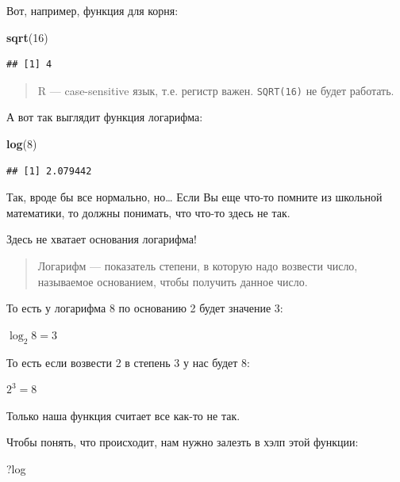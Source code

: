 \documentclass[]{book}
\newenvironment{Shaded}{\begin{snugshade}}{\end{snugshade}}
\newcommand{\DecValTok}[1]{\textcolor[rgb]{0.00,0.00,0.81}{#1}}
\newcommand{\KeywordTok}[1]{\textcolor[rgb]{0.13,0.29,0.53}{\textbf{#1}}}
\newcommand{\NormalTok}[1]{#1}
\begin{document}
Вот, например, функция для корня:

\begin{Shaded}
\begin{Highlighting}[]
\KeywordTok{sqrt}\NormalTok{(}\DecValTok{16}\NormalTok{)}
\end{Highlighting}
\end{Shaded}

\begin{verbatim}
## [1] 4
\end{verbatim}

\begin{quote}
R --- case-sensitive язык, т.е. регистр важен. \texttt{SQRT(16)} не будет работать.
\end{quote}

А вот так выглядит функция логарифма:

\begin{Shaded}
\begin{Highlighting}[]
\KeywordTok{log}\NormalTok{(}\DecValTok{8}\NormalTok{)}
\end{Highlighting}
\end{Shaded}

\begin{verbatim}
## [1] 2.079442
\end{verbatim}

Так, вроде бы все нормально, но\ldots{} Если Вы еще что-то помните из школьной математики, то должны понимать, что что-то здесь не так.

Здесь не хватает основания логарифма!

\begin{quote}
Логарифм --- показатель степени, в которую надо возвести число, называемое основанием, чтобы получить данное число.
\end{quote}

То есть у логарифма 8 по основанию 2 будет значение 3:

\(\log_2 8 = 3\)

То есть если возвести 2 в степень 3 у нас будет 8:

\(2^3 = 8\)

Только наша функция считает все как-то не так.

Чтобы понять, что происходит, нам нужно залезть в хэлп этой функции:

\begin{Shaded}
\begin{Highlighting}[]
\NormalTok{?log}
\end{Highlighting}
\end{Shaded}
\end{document}
